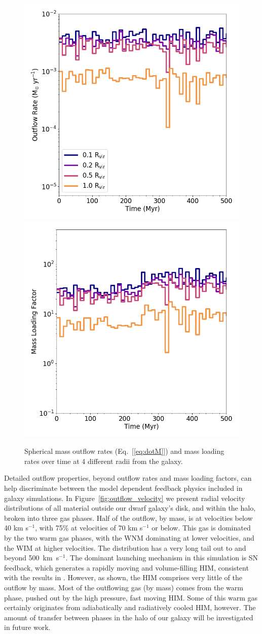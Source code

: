 \documentclass[twocolumn]{aastex61}
\begin{document}
\begin{figure}
\centering
\includegraphics[width=0.45\linewidth]{total_mass_outflow}
\includegraphics[width=0.45\linewidth]{total_mass_loading}
\caption{Spherical mass outflow rates (Eq.~[\ref{eq:dotM}]) and mass loading rates over time at 4 different radii from the galaxy.}
\label{fig:mass_outflow}
\end{figure}

Detailed outflow properties, beyond outflow rates and mass loading factors, can help discriminate between the model dependent feedback physics included in galaxy simulations. In Figure~\ref{fig:outflow_velocity} we present radial velocity distributions of all material outside our dwarf galaxy's disk, and within the halo, broken into three gas phases. Half of the outflow, by mass, is at velocities below 40 km s$^{-1}$, with 75\% at velocities of 70 km s$^{-1}$ or below. This gas is dominated by the two warm gas phases, with the WNM dominating at lower velocities, and the WIM at higher velocities. The distribution has a very long tail out to and beyond 500~km~s$^{-1}$. The dominant launching mechanism in this simulation is SN feedback, which generates a rapidly moving and volume-filling HIM, consistent with the results in \citet{Hu2016,Hu2017}. However, as shown, the HIM comprises very little of the outflow by mass. Most of the outflowing gas (by mass) comes from the warm phase, pushed out by the high pressure, fast moving HIM. Some of this warm gas certainly originates from adiabatically and radiatively cooled HIM, however. The amount of transfer between phases in the halo of our galaxy will be investigated in future work.
\end{document}
